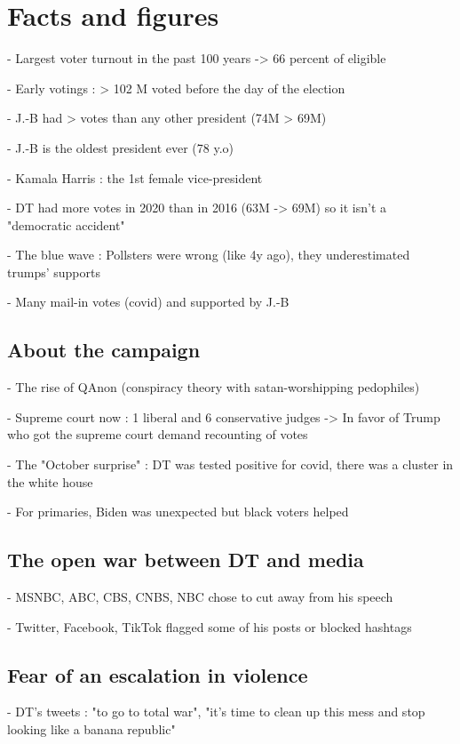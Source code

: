 \documentclass[10pt]{article}
\begin{document}
\section*{Facts and figures}

- Largest voter turnout in the past 100 years -> 66 percent of eligible

- Early votings : > 102 M voted before the day of the election

- J.-B had > votes than any other president (74M > 69M)

- J.-B is the oldest president ever (78 y.o)

- Kamala Harris : the 1st female vice-president

- DT had more votes in 2020 than in 2016 (63M -> 69M) so it isn't a "democratic accident"

- The blue wave : Pollsters were wrong (like 4y ago), they underestimated 
trumps' supports

- Many mail-in votes (covid) and supported by J.-B

\subsection*{About the campaign}

- The rise of QAnon (conspiracy theory with satan-worshipping pedophiles)

- Supreme court now : 1 liberal and 6 conservative judges -> In favor of Trump
 who got the supreme court demand recounting of votes

- The "October surprise" : DT was tested positive for covid, there was a cluster in 
the white house 

- For primaries, Biden was unexpected but black voters helped

\subsection*{The open war between DT and media}

- MSNBC, ABC, CBS, CNBS, NBC chose to cut away from his speech

- Twitter, Facebook, TikTok flagged some of his posts or blocked hashtags

\subsection*{Fear of an escalation in violence}

- DT's tweets : "to go to total war", "it's time to clean up this mess and 
stop looking like a banana republic"
\end{document}
